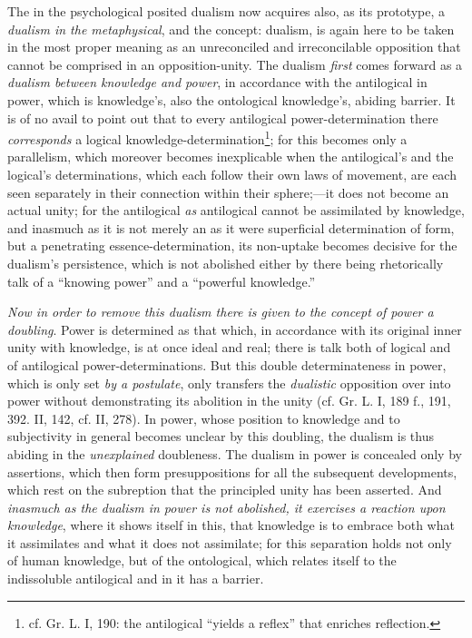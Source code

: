 \documentclass[12pt,a4paper]{book}
\begin{document}
The in the psychological posited dualism now acquires also, as its prototype, a \emph{dualism in the
metaphysical}, and the concept: dualism, is again here to be taken in the most proper meaning as an
unreconciled and irreconcilable opposition that cannot be comprised in an opposition-unity. The
dualism \emph{first} comes forward as a \emph{dualism between knowledge and power}, in accordance with the
antilogical in power, which is knowledge's, also the ontological knowledge's, abiding barrier. It is
of no avail to point out that to every antilogical power-determination there \emph{corresponds} a
logical knowledge-determination\footnote{cf. Gr. L. I, 190: the antilogical ``yields a reflex'' that
enriches reflection.}; for this becomes only a parallelism, which moreover becomes inexplicable when
the antilogical's and the logical's determinations, which each follow their own laws of movement, are
each seen separately in their connection within their sphere;---it does not become an actual unity;
for the antilogical \emph{as} antilogical cannot be assimilated by knowledge, and inasmuch as it is not merely
an as it were superficial determination of form, but a penetrating essence-determination, its
non-uptake becomes decisive for the dualism's persistence, which is not abolished either by there being
rhetorically talk of a ``knowing power'' and a ``powerful knowledge.''

\emph{Now in order to remove this dualism there is given to the concept of power a doubling}.
Power is determined as that which, in accordance with its original inner unity with knowledge, is at
once ideal and real; there is talk both of logical and of antilogical power-determinations. But this
double determinateness in power, which is only set \emph{by a postulate}, only transfers the \emph{dualistic}
opposition over into power without demonstrating its abolition in the unity (cf. Gr. L. I, 189 f., 191,
392. II, 142, cf. II, 278). In power, whose position to knowledge and to subjectivity in general
becomes unclear by this doubling, the dualism is thus abiding in the \emph{unexplained} doubleness. The
dualism in power is concealed only by assertions, which then form presuppositions for all the
subsequent developments, which rest on the subreption that the principled unity has been asserted. And
\emph{inasmuch as the dualism in power is not abolished, it exercises a reaction upon knowledge},
where it shows itself in this, that knowledge is to embrace both what it assimilates and what it does
not assimilate; for this separation holds not only of human knowledge, but of the ontological, which
relates itself to the indissoluble antilogical and in it has a barrier.
\end{document}
